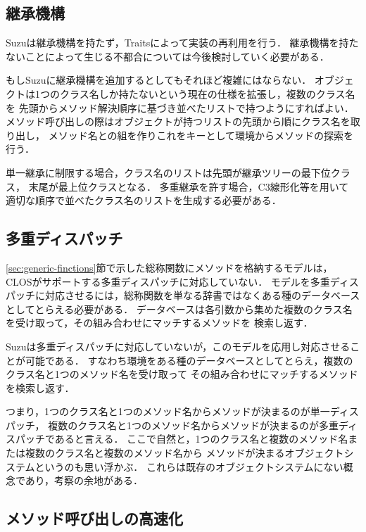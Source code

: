 \documentclass{ipsjprosym}
\begin{document}
\subsection{継承機構}

Suzuは継承機構を持たず，Traitsによって実装の再利用を行う．
継承機構を持たないことによって生じる不都合については今後検討していく必要がある．

もしSuzuに継承機構を追加するとしてもそれほど複雑にはならない．
オブジェクトは1つのクラス名しか持たないという現在の仕様を拡張し，複数のクラス名を
先頭からメソッド解決順序に基づき並べたリストで持つようにすればよい．
メソッド呼び出しの際はオブジェクトが持つリストの先頭から順にクラス名を取り出し，
メソッド名との組を作りこれをキーとして環境からメソッドの探索を行う．

単一継承に制限する場合，クラス名のリストは先頭が継承ツリーの最下位クラス，
末尾が最上位クラスとなる．
多重継承を許す場合，C3線形化\cite{Barrett:1996:MSL:236337.236343}等を用いて
適切な順序で並べたクラス名のリストを生成する必要がある．

\subsection{多重ディスパッチ}
\label{sec:multiple-dispatch}

\ref{sec:generic-finctions}節で示した総称関数にメソッドを格納するモデルは，
CLOSがサポートする多重ディスパッチに対応していない．
モデルを多重ディスパッチに対応させるには，総称関数を単なる辞書ではなくある種のデータベース
としてとらえる必要がある．
データベースは各引数から集めた複数のクラス名を受け取って，その組み合わせにマッチするメソッドを
検索し返す．

Suzuは多重ディスパッチに対応していないが，このモデルを応用し対応させることが可能である．
すなわち環境をある種のデータベースとしてとらえ，複数のクラス名と1つのメソッド名を受け取って
その組み合わせにマッチするメソッドを検索し返す．

つまり，1つのクラス名と1つのメソッド名からメソッドが決まるのが単一ディスパッチ，
複数のクラス名と1つのメソッド名からメソッドが決まるのが多重ディスパッチであると言える．
ここで自然と，1つのクラス名と複数のメソッド名または複数のクラス名と複数のメソッド名から
メソッドが決まるオブジェクトシステムというのも思い浮かぶ．
これらは既存のオブジェクトシステムにない概念であり，考察の余地がある．

\subsection{メソッド呼び出しの高速化}
\end{document}
